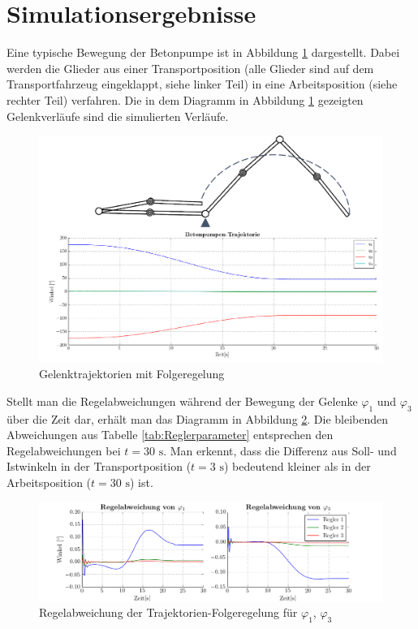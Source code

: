 \section{Simulationsergebnisse}
Eine typische Bewegung der Betonpumpe ist in Abbildung \ref{fig:Verlauf_Trajektorienfolgeregelung} dargestellt. Dabei werden die Glieder aus einer Transportposition (alle Glieder sind auf dem Transportfahrzeug eingeklappt, siehe linker Teil) in eine Arbeitsposition (siehe rechter Teil) verfahren. Die in dem Diagramm in Abbildung \ref{fig:Verlauf_Trajektorienfolgeregelung} gezeigten Gelenkverläufe sind die simulierten Verläufe. 
	\begin{figure}[h!]
		\centering
		\includegraphics[scale=0.7]{Bilder/Verlauf_Trajektorienfolgeregelung.pdf}
		\caption{Gelenktrajektorien mit Folgeregelung}
		\label{fig:Verlauf_Trajektorienfolgeregelung}
	\end{figure}\newline
Stellt man die Regelabweichungen während der Bewegung der Gelenke $\varphi_1$  und $\varphi_3$ über die Zeit dar, erhält man das Diagramm in Abbildung \ref{fig:Regelabweichung_Folgeregelung}. Die bleibenden Abweichungen aus Tabelle \ref{tab:Reglerparameter} entsprechen den Regelabweichungen bei $t=30\text{ s}$. Man erkennt, dass die Differenz aus Soll- und Istwinkeln in der Transportposition ($t=3\text{ s}$) bedeutend kleiner als in der Arbeitsposition ($t=30\text{ s}$) ist.
\newline 
	\begin{figure}[h!]
		\centering
		\includegraphics[scale=0.55]{Bilder/Regelabweichung_Folgeregelung.png}
		\caption{Regelabweichung der Trajektorien-Folgeregelung für $\varphi_1$, $\varphi_3$}
		\label{fig:Regelabweichung_Folgeregelung}
	\end{figure}\newline
	
